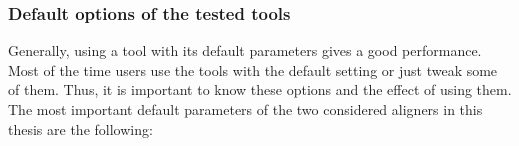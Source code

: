 \documentclass[11pt,a4paper]{report}
\begin{document}

\subsubsection{Default options of the tested tools}

Generally, using a tool with its default parameters gives a good performance. Most of the time users use the tools with the default setting or just tweak some of them. Thus, it is important to know these
options and the effect of using them.  
The most important default parameters of the two considered aligners in this thesis are the following:
\end{document}
